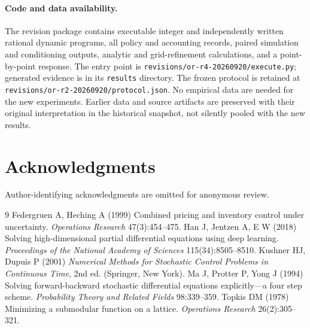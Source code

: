 \paragraph{Code and data availability.}
The revision package contains executable integer and independently written rational dynamic programs, all policy and accounting records, paired simulation and conditioning outputs, analytic and grid-refinement calculations, and a point-by-point response. The entry point is \texttt{revisions/or-r4-20260920/execute.py}; generated evidence is in its \texttt{results} directory. The frozen protocol is retained at \texttt{revisions/or-r2-20260920/protocol.json}. No empirical data are needed for the new experiments. Earlier data and source artifacts are preserved with their original interpretation in the historical snapshot, not silently pooled with the new results.

\section*{Acknowledgments}
Author-identifying acknowledgments are omitted for anonymous review.

\begin{thebibliography}{9}
Federgruen A, Heching A (1999) Combined pricing and inventory control under uncertainty. \emph{Operations Research} 47(3):454--475.
Han J, Jentzen A, E W (2018) Solving high-dimensional partial differential equations using deep learning. \emph{Proceedings of the National Academy of Sciences} 115(34):8505--8510.
Kushner HJ, Dupuis P (2001) \emph{Numerical Methods for Stochastic Control Problems in Continuous Time}, 2nd ed. (Springer, New York).
Ma J, Protter P, Yong J (1994) Solving forward-backward stochastic differential equations explicitly---a four step scheme. \emph{Probability Theory and Related Fields} 98:339--359.
Topkis DM (1978) Minimizing a submodular function on a lattice. \emph{Operations Research} 26(2):305--321.
\end{thebibliography}
\clearpage


